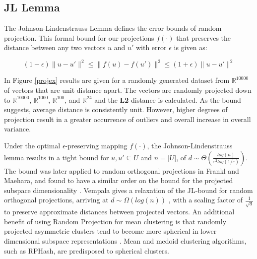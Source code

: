 \subsection{JL Lemma}
The Johnson-Lindenstrauss Lemma defines the error bounds of random projection.  This formal bound for our projections
$f(\cdot)$ that preserves the distance between any two vectors $u$ and $u'$ with error $\epsilon$ is given as: 

\begin{Theorem}
$$
 (1-\epsilon) \|u-u'\|^2 \leq \|f(u)-f(u')\|^2 \leq (1+\epsilon) \| u-u' \|^2
$$
\end{Theorem}

In Figure \ref{projex} results are given for a randomly generated dataset from $\mathbb{R}^{10000}$ of vectors that are
unit distance apart.  The vectors are randomly projected down to $\mathbb{R}^{10000}$, $\mathbb{R}^{1000}$,
$\mathbb{R}^{100}$, and $\mathbb{R}^{24}$ and the \textbf{L2} distance is calculated.  As the bound suggests, average
distance is consistently unit.  However, higher degrees of projection result in a greater occurrence of outliers and
overall increase in overall variance.

Under the optimal $\epsilon$-preserving mapping $f(\cdot)$, the Johnson-Lindenstrauss lemma results in a tight bound for
$u,u' \subseteq U$ and $n=|U|$, of $d \sim \Theta( {\frac{log(n)} {\varepsilon^2 log(1/\varepsilon) }})$.  The bound was
later applied to random orthogonal projections in Frankl and Maehara, and found to have a similar order on the bound for
the projected subspace dimensionality \cite{Frankl}.  Vempala gives a relaxation of the JL-bound for random orthogonal
projections, arriving at $d \sim \Omega(log(n))$ \cite{vempala}, with a scaling factor of ${\frac{1}{\sqrt{d}}}$ to
preserve approximate distances between projected vectors.
An additional benefit of using Random Projection for mean clustering is that randomly projected asymmetric clusters tend
to become more spherical in lower dimensional subspace representations \cite{bingham}.  Mean and medoid clustering
algorithms, such as \textsf{RPHash}, are predisposed to spherical clusters.

